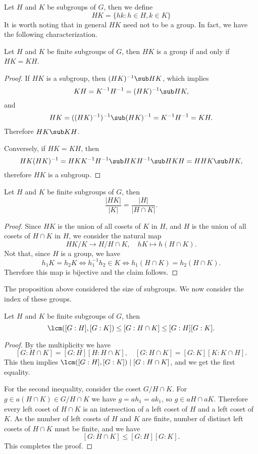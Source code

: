 Let $H$ and $K$ be subgroups of $G$, then we define
\[HK=\{hk:h\in H,k\in K\}\]
It is worth noting that in general $HK$ need not to be a group. In fact, we have the following characterization.
\begin{proposition}
Let $H$ and $K$ be finite subgroups of $G$, then $HK$ is a group if and only if $HK=KH$.
\end{proposition}
\begin{proof}
If $HK$ is a subgroup, then $(HK)^{-1}\sub HK$, which implies
\[KH=K^{-1}H^{-1}=(HK)^{-1}\sub HK,\]
and
\[HK=((HK)^{-1})^{-1}\sub(HK)^{-1}=K^{-1}H^{-1}=KH.\]
Therefore $HK\sub KH$.\par
Conversely, if $HK=KH$, then
\[HK(HK)^{-1}=HKK^{-1}H^{-1}\sub HKH^{-1}\sub HKH=HHK\sub HK,\]
therefore $HK$ is a subgroup.
\end{proof}
\begin{proposition}\label{subgroup product formula}
Let $H$ and $K$ be finite subgroups of $G$, then
\[\frac{|HK|}{|K|}=\frac{|H|}{|H\cap K|}.\]
\end{proposition}
\begin{proof}
Since $HK$ is the union of all cosets of $K$ in $H$, and $H$ is the union of all cosets of $H\cap K$ in $H$, we consider the natural map
\[HK/K\to H/H\cap K,\quad hK\mapsto h(H\cap K).\]
Not that, since $H$ is a group, we have
\[h_1K=h_2K\iff h_1^{-1}h_2\in K\iff h_1(H\cap K)=h_2(H\cap K).\]
Therefore this map is bijective and the claim follows.
\end{proof}
The proposition above considered the size of subgroups. We now consider the index of these groups.
\begin{proposition}\label{subgroup index formula}
Let $H$ and $K$ be finite subgroups of $G$, then
\[\lcm([G:H],[G:K])\leq[G:H\cap K]\leq[G:H][G:K].\]
\end{proposition}
\begin{proof}
By the multiplicity we have
\[[G:H\cap K]=[G:H][H:H\cap K],\quad [G:H\cap K]=[G:K][K:K\cap H].\]
This then implies $\lcm([G:H],[G:K])\mid[G:H\cap K]$, and we get the first equality.\par
For the second inequality, consider the coset $G/H\cap K$. For $g\in a(H\cap K)\in G/H\cap K$ we have $g=ah_1=ak_1$, so $g\in aH\cap aK$. Therefore every left coset of $H\cap K$ is an intersection of a left coset of $H$ and a left coset of $K$. As the number of left cosets of $H$ and $K$ are finite, number of distinct left cosets of $H\cap K$ must be finite, and we have
\[[G:H\cap K]\leq[G:H][G:K].\]
This completes the proof.
\end{proof}
